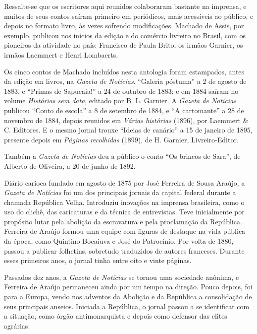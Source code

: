 Ressalte-se que os escritores aqui reunidos colaboraram bastante na
imprensa, e muitos de seus contos saíram primeiro em periódicos, mais
acessíveis ao público, e depois no formato livro, às vezes sofrendo
modificações. Machado de Assis, por exemplo, publicou nos inícios da
edição e do comércio livreiro no Brasil, com os pioneiros da atividade
no país: Francisco de Paula Brito, os irmãos Garnier, os irmãos Laemmert
e Henri Lombaerts.

Os cinco contos de Machado incluídos nesta antologia foram estampados,
antes da edição em livros, na \emph{Gazeta de Notícias}. ``Galeria
póstuma'' a 2 de agosto de 1883, e ``Primas de Sapucaia!'' a 24 de
outubro de 1883; e em 1884 saíram no volume \emph{Histórias sem data},
editado por B. L. Garnier. A \emph{Gazeta de Notícias} publicou ``Conto
de escola'' a 8 de setembro de 1884, e ``A cartomante'' a 28 de novembro
de 1884, depois reunidos em \emph{Várias histórias} (1896), por Laemmert
\& C. Editores. E o mesmo jornal trouxe ``Ideias de canário'' a 15 de
janeiro de 1895, presente depois em \emph{Páginas recolhidas} (1899), de
H. Garnier, Livreiro-Editor.

Também a \emph{Gazeta de Notícias} deu a público o conto ``Os brincos de
Sara'', de Alberto de Oliveira, a 20 de junho de 1892.

Diário carioca fundado em agosto de 1875 por José Ferreira de Sousa
Araújo, a \emph{Gazeta de Notícias} foi um dos principais jornais da
capital federal durante a chamada República Velha. Introduziu inovações
na imprensa brasileira, como o uso do clichê, das caricaturas e da
técnica de entrevistas. Teve inicialmente por propósito lutar pela
abolição da escravatura e pela proclamação da República. Ferreira de
Araújo formou uma equipe com figuras de destaque na vida pública da
época, como Quintino Bocaiuva e José do Patrocínio. Por volta de 1880,
passou a publicar folhetins, sobretudo traduzidos de autores franceses.
Durante esses primeiros anos, o jornal tinha entre oito e vinte páginas.

Passados dez anos, a \emph{Gazeta de Notícias} se tornou uma sociedade
anônima, e Ferreira de Araújo permaneceu ainda por um tempo na direção.
Pouco depois, foi para a Europa, vendo nos adventos da Abolição e da
República a consolidação de seus principais anseios. Iniciada a
República, o jornal passou a se identificar com a situação, como órgão
antimonarquista e depois como defensor das elites agrárias.


